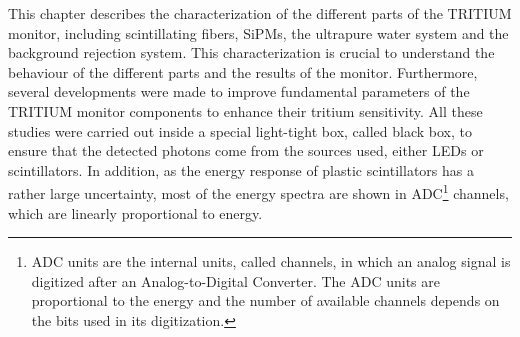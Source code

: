 This chapter describes the characterization of the different parts of the TRITIUM monitor, including scintillating fibers, SiPMs, the ultrapure water system and the background rejection system. This characterization is crucial to understand the behaviour of the different parts and the results of the monitor. Furthermore, several developments were made  to improve fundamental parameters of the TRITIUM monitor components to enhance their tritium sensitivity. All these studies were carried out inside a special light-tight box, called black box, to ensure that the detected photons come from the sources used, either LEDs or scintillators. In addition, as the energy response of plastic scintillators has a rather large uncertainty, most of the energy spectra are shown in ADC\footnote{ADC units are the internal units, called channels, in which an analog signal is digitized after an Analog-to-Digital Converter. The ADC units are proportional to the energy and the number of available channels depends on the bits used in its digitization.} channels, which are linearly proportional to energy.